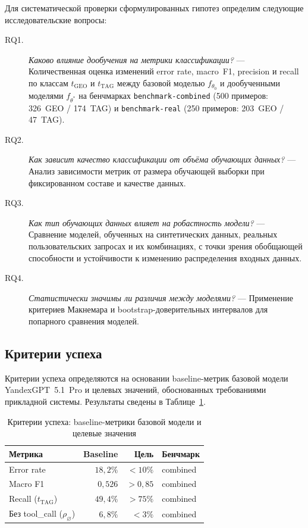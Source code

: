Для систематической проверки сформулированных гипотез определим следующие исследовательские вопросы:

\begin{description}
    \item[\textsc{RQ1}.] \emph{Каково влияние дообучения на метрики классификации?} --- Количественная оценка изменений error rate, macro~F1, precision и recall по классам $t_{\mathrm{GEO}}$ и $t_{\mathrm{TAG}}$ между базовой моделью $f_{\theta_0}$ и дообученными моделями $f_{\theta^*}$ на бенчмарках \texttt{benchmark-combined} (500 примеров: 326~GEO / 174~TAG) и \texttt{benchmark-real} (250 примеров: 203~GEO / 47~TAG).

    \item[\textsc{RQ2}.] \emph{Как зависит качество классификации от объёма обучающих данных?} --- Анализ зависимости метрик от размера обучающей выборки при фиксированном составе и качестве данных.

    \item[\textsc{RQ3}.] \emph{Как тип обучающих данных влияет на робастность модели?} --- Сравнение моделей, обученных на синтетических данных, реальных пользовательских запросах и их комбинациях, с точки зрения обобщающей способности и устойчивости к изменению распределения входных данных.

    \item[\textsc{RQ4}.] \emph{Статистически значимы ли различия между моделями?} --- Применение критериев Макнемара и bootstrap-доверительных интервалов для попарного сравнения моделей.
\end{description}

\subsection{Критерии успеха}

Критерии успеха определяются на основании baseline-метрик базовой модели YandexGPT~5.1~Pro и целевых значений, обоснованных требованиями прикладной системы. Результаты сведены в Таблице~\ref{tab:success_criteria}.

\begin{table}[H]
\centering
\caption{Критерии успеха: baseline-метрики базовой модели и целевые значения}
\label{tab:success_criteria}
\def\arraystretch{1.2}
\setlength\tabcolsep{0.4em}
\begin{tabular}{l r r l}
    \toprule
    \textbf{Метрика} & \textbf{Baseline} & \textbf{Цель} & \textbf{Бенчмарк} \\
    \midrule
    Error rate         & $18{,}2\%$ & $< 10\%$  & combined \\
    Macro F1           & $0{,}526$  & $> 0{,}85$ & combined \\
    Recall ($t_{\mathrm{TAG}}$) & $49{,}4\%$ & $> 75\%$  & combined \\
    Без tool\_call ($\rho_{\varnothing}$) & $6{,}8\%$  & $< 3\%$   & combined \\
    \bottomrule
\end{tabular}
\end{table}

